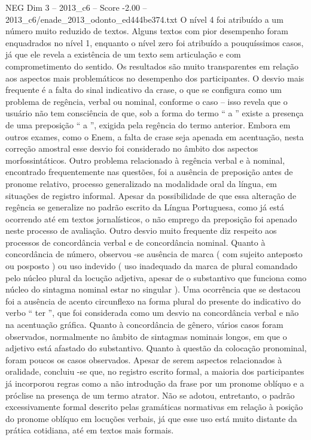 \begin{textsample}{NEG Dim 3 – 2013\_c6 – Score -2.00 – 2013\_c6/enade\_2013\_odonto\_ed444be374.txt}
O nível 4 foi atribuído a um número muito reduzido de textos.
Alguns textos com pior desempenho foram enquadrados no nível 1, enquanto o nível zero foi atribuído a pouquíssimos casos, já que ele revela a existência de um texto sem articulação e com comprometimento do sentido.
Os resultados são muito transparentes em relação aos aspectos mais problemáticos no desempenho dos participantes.
O desvio mais frequente é a falta do sinal indicativo da crase, o que se configura como um problema de regência, verbal ou nominal, conforme o caso – isso revela que o usuário não tem consciência de que, sob a forma do termo “ a ” existe a presença de uma preposição “ a ”, exigida pela regência do termo anterior.
Embora em outros exames, como o Enem, a falta de crase seja apenada em acentuação, nesta correção amostral esse desvio foi considerado no âmbito dos aspectos morfossintáticos.
Outro problema relacionado à regência verbal e à nominal, encontrado frequentemente nas questões, foi a ausência de preposição antes de pronome relativo, processo generalizado na modalidade oral da língua, em situações de registro informal.
Apesar da possibilidade de que essa alteração de regência se generalize no padrão escrito da Língua Portuguesa, como já está ocorrendo até em textos jornalísticos, o não emprego da preposição foi apenado neste processo de avaliação.
Outro desvio muito frequente diz respeito aos processos de concordância verbal e de concordância nominal.
Quanto à concordância de número, observou -se ausência de marca ( com sujeito anteposto ou posposto ) ou uso indevido ( uso inadequado da marca de plural comandado pelo núcleo plural da locução adjetiva, apesar de o substantivo que funciona como núcleo do sintagma nominal estar no singular ).
Uma ocorrência que se destacou foi a ausência de acento circunflexo na forma plural do presente do indicativo do verbo “ ter ”, que foi considerada como um desvio na concordância verbal e não na acentuação gráfica.
Quanto à concordância de gênero, vários casos foram observados, normalmente no âmbito de sintagmas nominais longos, em que o adjetivo está afastado do substantivo.
Quanto à questão da colocação pronominal, foram poucos os casos observados.
Apesar de serem aspectos relacionados à oralidade, concluiu -se que, no registro escrito formal, a maioria dos participantes já incorporou regras como a não introdução da frase por um pronome oblíquo e a próclise na presença de um termo atrator.
Não se adotou, entretanto, o padrão excessivamente formal descrito pelas gramáticas normativas em relação à posição do pronome oblíquo em locuções verbais, já que esse uso está muito distante da prática cotidiana, até em textos mais formais.

\end{textsample}
